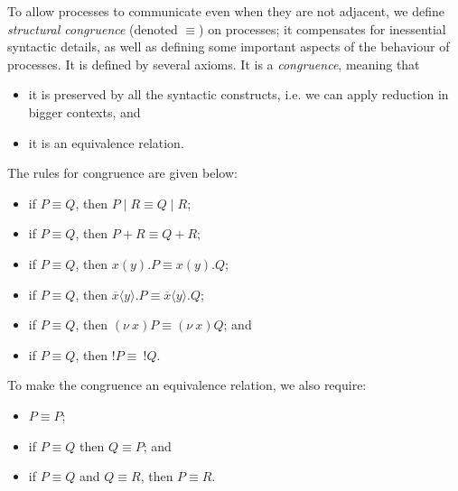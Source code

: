 \documentclass[a4paper, openany]{memoir}
\theoremstyle{definition}
\begin{document}
    To allow processes to communicate even when they are not adjacent, we define \emph{structural congruence} (denoted $\equiv$) on processes; it compensates for inessential syntactic details, as well as defining some important aspects of the behaviour of processes. It is defined by several axioms. It is a \emph{congruence}, meaning that
    \begin{itemize}
        \item it is preserved by all the syntactic constructs, i.e. we can apply reduction in bigger contexts, and
        \item it is an equivalence relation.
    \end{itemize}
    The rules for congruence are given below:
    \begin{itemize}
        \item if $P \equiv Q$, then $P \mid R \equiv Q \mid R$;
        \item if $P \equiv Q$, then $P + R \equiv Q + R$;
        \item if $P \equiv Q$, then $x(y).P \equiv x(y).Q$;
        \item if $P \equiv Q$, then $\overline{x}\langle y\rangle.P \equiv \overline{x}\langle y\rangle.Q$;
        \item if $P \equiv Q$, then $(\nu \ x)P \equiv (\nu \ x)Q$; and
        \item if $P \equiv Q$, then $!P \equiv \ !Q$.
    \end{itemize}
    To make the congruence an equivalence relation, we also require:
    \begin{itemize}
        \item $P \equiv P$;
        \item if $P \equiv Q$ then $Q \equiv P$; and 
        \item if $P \equiv Q$ and $Q \equiv R$, then $P \equiv R$.
    \end{itemize}
    
\end{document}

